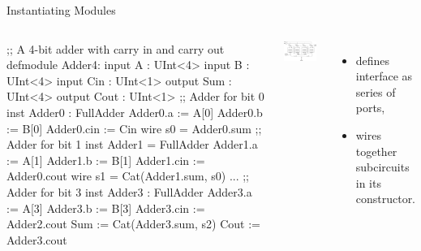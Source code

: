 \documentclass[xcolor=pdflatex,dvipsnames,table]{beamer}
\begin{document}
\begin{frame}[fragile]{Instantiating Modules}

\begin{columns}


{
\begin{stanza}
;; A 4-bit adder with carry in and carry out
defmodule Adder4:
  input A : UInt<4>
  input B : UInt<4>
  input Cin : UInt<1>
  output Sum : UInt<4>
  output Cout : UInt<1>
  ;; Adder for bit 0
  inst Adder0 : FullAdder
  Adder0.a   := A[0]
  Adder0.b   := B[0]
  Adder0.cin := Cin
  wire s0 = Adder0.sum
  ;; Adder for bit 1
  inst Adder1 = FullAdder
  Adder1.a   := A[1]
  Adder1.b   := B[1]
  Adder1.cin := Adder0.cout
  wire s1 = Cat(Adder1.sum, s0)
  ...
  ;; Adder for bit 3
  inst Adder3 : FullAdder
  Adder3.a   := A[3]
  Adder3.b   := B[3]
  Adder3.cin := Adder2.cout
  Sum  := Cat(Adder3.sum, s2)
  Cout := Adder3.cout
\end{stanza}
}


\begin{center}
\includegraphics[width=0.9\textwidth]{../getting-started/figs/4_Bit_Adder.jpg}
\end{center}

\begin{itemize}
\item defines interface as series of ports,
\item wires together subcircuits in its constructor.
\end{itemize}

\end{columns}

\end{frame}
\end{document}
